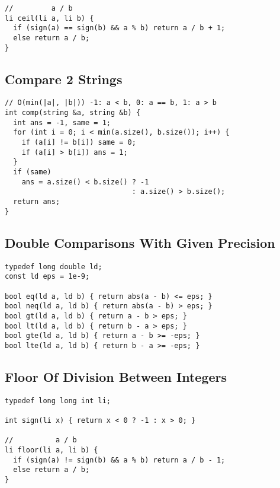 \documentclass[twoside]{article}
\newcommand{\fileTitleStyle}{\large\underline}
\begin{document}
\begin{multicols*}{2}
\begin{verbatim}
//         a / b
li ceil(li a, li b) {
  if (sign(a) == sign(b) && a % b) return a / b + 1;
  else return a / b;
}
\end{verbatim}

\subsectionfont{\centering\bfseries\LARGE}
\subsectionfont{\fileTitleStyle}
\subsection*{Compare 2 Strings}
\begin{verbatim}
// O(min(|a|, |b|)) -1: a < b, 0: a == b, 1: a > b
int comp(string &a, string &b) {
  int ans = -1, same = 1;
  for (int i = 0; i < min(a.size(), b.size()); i++) {
    if (a[i] != b[i]) same = 0;
    if (a[i] > b[i]) ans = 1;
  }
  if (same)
    ans = a.size() < b.size() ? -1
                              : a.size() > b.size();
  return ans;
}
\end{verbatim}

\subsectionfont{\centering\bfseries\LARGE}
\subsectionfont{\fileTitleStyle}
\subsection*{Double Comparisons With Given Precision}
\begin{verbatim}
typedef long double ld;
const ld eps = 1e-9;

bool eq(ld a, ld b) { return abs(a - b) <= eps; }
bool neq(ld a, ld b) { return abs(a - b) > eps; }
bool gt(ld a, ld b) { return a - b > eps; }
bool lt(ld a, ld b) { return b - a > eps; }
bool gte(ld a, ld b) { return a - b >= -eps; }
bool lte(ld a, ld b) { return b - a >= -eps; }
\end{verbatim}

\subsectionfont{\centering\bfseries\LARGE}
\subsectionfont{\fileTitleStyle}
\subsection*{Floor Of Division Between Integers}
\begin{verbatim}
typedef long long int li;

int sign(li x) { return x < 0 ? -1 : x > 0; }

//          a / b
li floor(li a, li b) {
  if (sign(a) != sign(b) && a % b) return a / b - 1;
  else return a / b;
}
\end{verbatim}


\end{multicols*}
\end{document}
